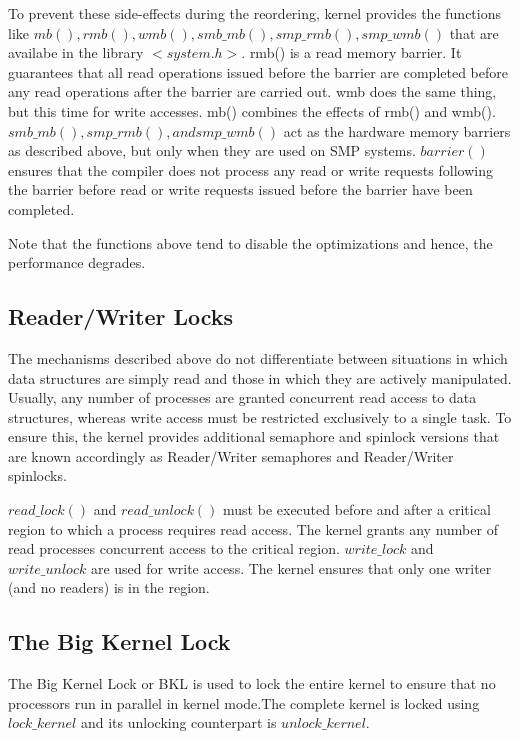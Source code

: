 \documentclass[a4paper]{article}
\begin{document}
To prevent these side-effects during the reordering, kernel provides the functions like $mb(),rmb(),wmb(),
smb\_mb(),smp\_rmb(),smp\_wmb()$ that are availabe in the library $<system.h>$. rmb() is a read memory barrier. It guarantees that all read operations issued before the barrier are completed before any read operations after the barrier are carried out. wmb does the same thing, but this time for write accesses. mb() combines the effects of rmb() and wmb().
$smb\_mb() , smp\_rmb() , and smp\_wmb()$ act as the hardware memory barriers as described above, but only when they are used on SMP systems. $barrier()$ ensures that the compiler does not process any read or write requests following the barrier before read or write requests issued before the barrier have been
completed.

Note that the functions above tend to disable the optimizations and hence, the performance degrades.

\subsection{Reader/Writer Locks}

The mechanisms described above do not differentiate between situations in which data structures are simply read and those in which they are actively manipulated. Usually, any number of processes are granted concurrent read access to data structures, whereas write access must be restricted exclusively to a single task. To ensure this, the kernel provides additional semaphore and spinlock versions that are known accordingly as Reader/Writer semaphores and Reader/Writer spinlocks.

$read\_lock()$ and $read\_unlock()$ must be executed before and after a critical region to which a process requires read access. The kernel grants any number of read processes concurrent access to the critical region.
$write\_lock$ and $write\_unlock$ are used for write access. The kernel ensures that only one writer
(and no readers) is in the region.

\subsection{The Big Kernel Lock}

The Big Kernel Lock or BKL is used to lock the entire kernel to ensure that no processors run in parallel in kernel mode.The complete kernel is locked using $lock\_kernel$ and its unlocking counterpart is $unlock\_kernel$. 
\end{document}
